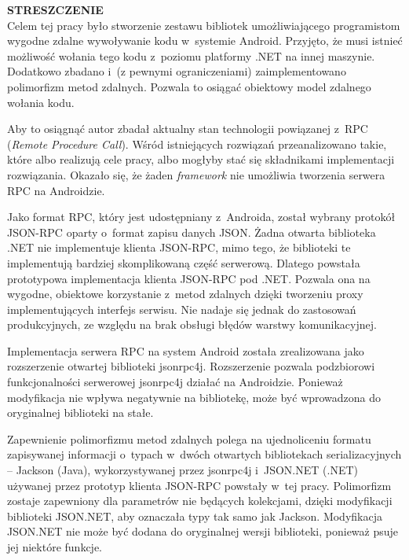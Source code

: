 \documentclass[twoside,a4paper]{book}
\begin{document}
\mainmatter




{\noindent \large \textbf{STRESZCZENIE}} \\
Celem tej pracy było stworzenie zestawu bibliotek umożliwiającego programistom wygodne zdalne wywoływanie kodu w~systemie Android.
Przyjęto, że musi istnieć możliwość wołania tego kodu z~poziomu platformy .NET na innej maszynie.
Dodatkowo zbadano i~(z pewnymi ograniczeniami) zaimplementowano polimorfizm metod zdalnych.
Pozwala to osiągać obiektowy model zdalnego wołania kodu.

Aby to osiągnąć autor zbadał aktualny stan technologii powiązanej z~RPC (\emph{Remote Procedure Call}).
Wśród istniejących rozwiązań przeanalizowano takie, które albo realizują cele pracy, albo mogłyby stać się składnikami implementacji rozwiązania.
Okazało się, że żaden \emph{framework} nie umożliwia tworzenia serwera RPC na Androidzie.

Jako format RPC, który jest udostępniany z~Androida, został wybrany protokół JSON-RPC oparty o~format zapisu danych JSON.
Żadna otwarta biblioteka .NET nie implementuje klienta JSON-RPC, mimo tego, że biblioteki te implementują bardziej skomplikowaną część serwerową.
Dlatego powstała prototypowa implementacja klienta JSON-RPC pod .NET. Pozwala ona na wygodne, obiektowe korzystanie z~metod zdalnych dzięki tworzeniu proxy implementujących interfejs serwisu.
Nie nadaje się jednak do zastosowań produkcyjnych, ze względu na brak obsługi błędów warstwy komunikacyjnej.

Implementacja serwera RPC na system Android została zrealizowana jako rozszerzenie otwartej biblioteki jsonrpc4j.
Rozszerzenie pozwala podzbiorowi funkcjonalności serwerowej jsonrpc4j działać na Androidzie.
Ponieważ modyfikacja nie wpływa negatywnie na bibliotekę, może być wprowadzona do oryginalnej biblioteki na stałe.

Zapewnienie polimorfizmu metod zdalnych polega na ujednoliceniu formatu zapisywanej informacji o~typach w~dwóch otwartych bibliotekach serializacyjnych -- Jackson (Java), wykorzystywanej przez jsonrpc4j i~JSON.NET (.NET) używanej przez prototyp klienta JSON-RPC powstały w~tej pracy.
Polimorfizm zostaje zapewniony dla parametrów nie będących kolekcjami, dzięki modyfikacji biblioteki JSON.NET, aby oznaczała typy tak samo jak Jackson.
Modyfikacja JSON.NET nie może być dodana do oryginalnej wersji biblioteki, ponieważ psuje jej niektóre funkcje.
\end{document}
